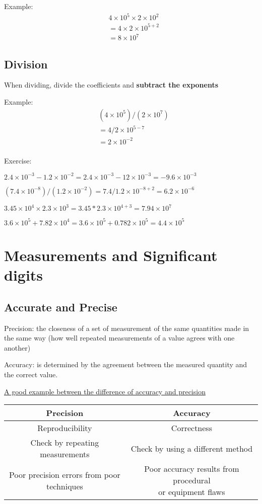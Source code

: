 \documentclass[12pt]{article}
\newcommand{\sn}[2]{#1\times10^{#2}}
\begin{document}
Example:
\begin{align*}
    &\sn{4}{5}\times\sn{2}{2}\\
    &=\sn{4\times2}{5+2}\\
    &=\sn{8}{7}
\end{align*}
\subsection{Division}
When dividing, divide the coefficients and \textbf{subtract the exponents}

Example:
\begin{align*}
    &(\sn{4}{5})/(\sn{2}{7})\\
    &=\sn{4/2}{5-7}\\
    &=\sn{2}{-2}\\
\end{align*}

Exercise:

$\sn{2.4}{-3}-\sn{1.2}{-2}=\sn{2.4}{-3}-\sn{12}{-3}=\sn{-9.6}{-3}$

$(\sn{7.4}{-8})/(\sn{1.2}{-2})=\sn{7.4/1.2}{-8+2}=\sn{6.2}{-6}$

$\sn{3.45}{4}\times\sn{2.3}{3}=\sn{3.45*2.3}{4+3}=\sn{7.94}{7}$

$\sn{3.6}{5}+\sn{7.82}{4}=\sn{3.6}{5}+\sn{0.782}{5}=\sn{4.4}{5}$

\section{Measurements and Significant digits}
\subsection{Accurate and Precise}
Precision: the closeness of a set of measurement of the same quantities made in the same way (how well repeated measurements of a value agrees with one another)

Accuracy: is determined by the agreement between the measured quantity and the correct value.

\href{https://www.dnasoftware.com/wp-content/uploads/2015/07/targets.png}{A good example between the difference of accuracy and precision}

\begin{tabular}{c|c}
    Precision&Accuracy\\
    \hline
    Reproducibility&Correctness\\
    Check by repeating measurements&Check by using a different method\\
    \makecell[l]{Poor precision errors from poor\\techniques}&\makecell[l]{Poor accuracy results from procedural\\or equipment flaws}
\end{tabular}
\end{document}
